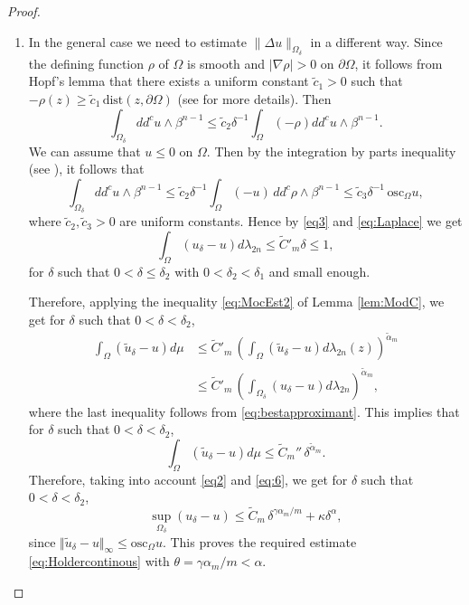 \begin{proof}
\begin{enumerate}
\item
In the general case we need to estimate $\|\Delta u\|_{\Omega_\delta}$ in a different way. Since the defining function $\rho$ of $\Omega$ is smooth and $\vert \nabla \rho \vert > 0$ on $\partial \Omega$, it follows from Hopf's lemma that there exists a uniform constant $\tilde c_1 > 0$ such that $- \rho (z) \geq \tilde c_1 \, \text{dist} (z, \partial \Omega)$ (see \cite{Ze20} for more details). Then
\[
\int_{\Omega_\delta} dd^c u \wedge \beta^{n-1} \leq \tilde c_2 \delta^{-1} \int_{\Omega} (- \rho) dd^c u \wedge \beta^{n-1}.
\]
We can assume that $u \leq 0$ on $\Omega$. Then by the integration by parts inequality (see \cite[(2.5)]{BZ20}), it follows that
\begin{equation} \label{eq:Laplace}
\int_{\Omega_\delta} dd^c u \wedge \beta^{n-1} \leq \tilde c_2 \delta^{-1} \int_{\Omega} (- u) \, dd^c \rho \wedge \beta^{n-1}\leq \tilde c_3 \delta^{-1} \, \text{osc}_{\Omega} u,
\end{equation}
where $\tilde c_2, \tilde c_3 > 0$ are uniform constants. Hence by \eqref{eq3} and \eqref{eq:Laplace} we get
\begin{equation*} \label{eq5}
\int_{\Omega}({u}_{\delta}-u)d\lambda_{2n} \leq {\tilde C}'_m \delta \leq 1,
\end{equation*}
for $\delta$ such that $0 < \delta \leq \delta_2$ with $0 < \delta_2 < \delta_1$ and small enough.

Therefore, applying the inequality \eqref{eq:MocEst2} of Lemma \ref{lem:ModC}, we get for $\delta$ such that $0 < \delta < \delta_2$,
\begin{align*}
\int_{\Omega}(\tilde{u}_{\delta}-u)d\mu & \leq \tilde C'_m \, \left(\int_{\Omega}(\tilde{u}_{\delta}-u) d\lambda_{2 n} (z)\right)^{\tilde \alpha_m} \\
&\leq \tilde C'_m \, \left(\int_{\Omega_{\delta}}({u}_{\delta}-u)d\lambda_{2 n} \right)^{\tilde \alpha_m},
\end{align*}
where the last inequality follows from \eqref{eq:bestapproximant}. This implies that for $\delta$ such that \hbox{$0\!<\!\delta\!<\!\delta_2$},
\begin{equation} \label{eq:6}
\int_{\Omega}(\tilde{u}_{\delta}-u)d\mu \leq \tilde C_m'' \, \delta^{\tilde \alpha_m}.
\end{equation}
Therefore, taking into account \eqref{eq2} and \eqref{eq:6}, we get for $\delta$ such that $0 < \delta < \delta_2$,
\[
\sup_{\Omega_{\delta}} ({u}_{\delta}-u) \leq \tilde C_m \, \delta^{\gamma\alpha_m \slash m} + \kappa \delta^{\alpha},
\]
since $\Vert \tilde u_{\delta} - u\Vert_{\infty}\!\leq\!\text{osc}_{\Omega} u$.
This proves the required estimate \eqref{eq:Holdercontinous} with \hbox{$\theta\!=\!\gamma\alpha_m/m\!<\!\alpha$}.\qedhere
\end{enumerate}
\end{proof}
